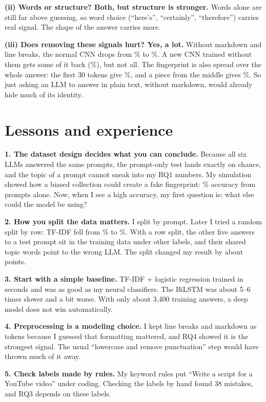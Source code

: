 \documentclass[11pt,letterpaper]{article}
\begin{document}
\textbf{(ii) Words or structure? Both, but structure is stronger.} Words alone are still far above guessing, so
word choice (``here's'', ``certainly'', ``therefore'') carries real signal. The shape of the answer carries more.

\textbf{(iii) Does removing these signals hurt? Yes, a lot.} Without markdown and line breaks, the normal CNN drops
from \AblOriginalTest\% to \AblNoFormatTest\%. A new CNN trained without them gets some of it back
(\AblNoFormatRetrain\%), but not all. The fingerprint is also spread over the whole answer: the first 30 tokens
give \AblOpeningOnlyRetrain\%, and a piece from the middle gives \AblMiddleOnlyRetrain\%. So just asking an LLM to
answer in plain text, without markdown, would already hide much of its identity.

\section{Lessons and experience}

\textbf{1. The dataset design decides what you can conclude.} Because all six LLMs answered the same prompts, the
prompt-only test lands exactly on chance, and the topic of a prompt cannot sneak into my RQ1 numbers. My
simulation showed how a biased collection could create a fake fingerprint: \BiasOneLr\% accuracy from prompts
alone. Now, when I see a high accuracy, my first question is: what else could the model be using?

\textbf{2. How you split the data matters.} I split by prompt. Later I tried a random split by row: TF-IDF fell
from \LrAcc\% to \RowSplitLr\%. With a row split, the other five answers to a test prompt sit in the training data
under other labels, and their shared topic words point to the wrong LLM. The split changed my result by about
\RowSplitGap{} points.

\textbf{3. Start with a simple baseline.} TF-IDF + logistic regression trained in seconds and was as good as my
neural classifiers. The BiLSTM was about 5--6 times slower and a bit worse. With only about 3,400 training answers,
a deep model does not win automatically.

\textbf{4. Preprocessing is a modeling choice.} I kept line breaks and markdown as tokens because I guessed that
formatting mattered, and RQ4 showed it is the strongest signal. The usual ``lowercase and remove punctuation''
step would have thrown much of it away.

\textbf{5. Check labels made by rules.} My keyword rules put ``Write a script for a YouTube video'' under coding.
Checking the labels by hand found 38 mistakes, and RQ3 depends on these labels.
\end{document}
